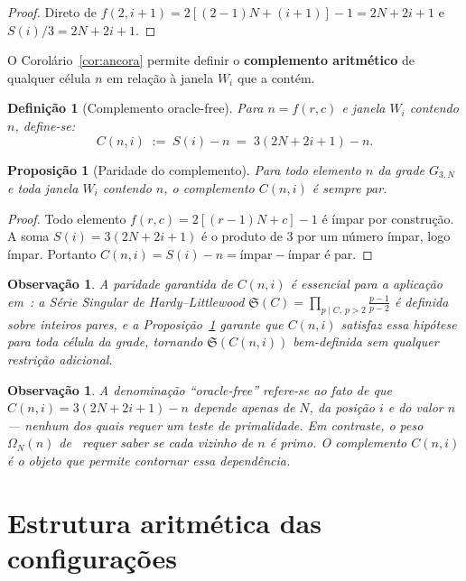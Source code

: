 \documentclass[12pt, a4paper]{article}
\newtheorem{proposicao}[lema]{Proposição}
\newtheorem{observacao}[lema]{Observação}
\newtheorem{definicao}[lema]{Definição}
\begin{document}
	\begin{proof}
		Direto de $f(2,i+1)=2[(2-1)N+(i+1)]-1=2N+2i+1$ e $S(i)/3=2N+2i+1$.
	\end{proof}
	
	O Corolário~\ref{cor:ancora} permite definir o \textbf{complemento aritmético} de
	qualquer célula $n$ em relação à janela $W_i$ que a contém.
	
	\begin{definicao}[Complemento oracle-free]
		\label{def:complemento}
		Para $n=f(r,c)$ e janela $W_i$ contendo $n$, define-se:
		\[
		C(n,i) \;:=\; S(i) - n \;=\; 3(2N+2i+1) - n.
		\]
	\end{definicao}
	
	\begin{proposicao}[Paridade do complemento]
		\label{prop:paridade}
		Para todo elemento $n$ da grade $G_{3,N}$ e toda janela $W_i$ contendo $n$,
		o complemento $C(n,i)$ é sempre par.
	\end{proposicao}
	
	\begin{proof}
		Todo elemento $f(r,c)=2[(r-1)N+c]-1$ é ímpar por construção. A soma
		$S(i)=3(2N+2i+1)$ é o produto de $3$ por um número ímpar, logo ímpar.
		Portanto $C(n,i)=S(i)-n=\text{ímpar}-\text{ímpar}$ é par.
	\end{proof}
	
	\begin{observacao}
		A paridade garantida de $C(n,i)$ é essencial para a aplicação em~\cite{bandeira2026c}:
		a Série Singular de Hardy–Littlewood $\mathfrak{S}(C)=\prod_{p\mid C,\, p>2}
		\frac{p-1}{p-2}$ é definida sobre inteiros pares, e a
		Proposição~\ref{prop:paridade} garante que $C(n,i)$ satisfaz essa hipótese
		para toda célula da grade, tornando $\mathfrak{S}(C(n,i))$ bem-definida sem
		qualquer restrição adicional.
	\end{observacao}
	
	\begin{observacao}
		A denominação ``oracle-free'' refere-se ao fato de que $C(n,i)=3(2N+2i+1)-n$
		depende apenas de $N$, da posição $i$ e do valor $n$ — nenhum dos quais requer
		um teste de primalidade. Em contraste, o peso $\Omega_N(n)$ de~\cite{bandeira2026}
		requer saber se cada vizinho de $n$ é primo. O complemento $C(n,i)$ é o objeto
		que permite contornar essa dependência.
	\end{observacao}
	
	\section{Estrutura aritmética das configurações}
	\label{sec:aritm}
	
\end{document}
